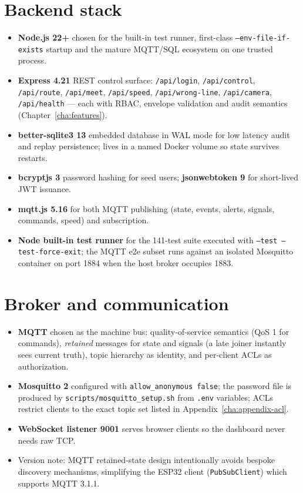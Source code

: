 \section{Backend stack}

\begin{itemize}
  \item \textbf{Node.js 22+} chosen for the built-in test runner, first-class
        \texttt{--env-file-if-exists} startup and the mature MQTT/SQL
        ecosystem on one trusted process.
  \item \textbf{Express 4.21} REST control surface: \texttt{/api/login},
        \texttt{/api/control}, \texttt{/api/route}, \texttt{/api/meet},
        \texttt{/api/speed}, \texttt{/api/wrong-line}, \texttt{/api/camera},
        \texttt{/api/health} --- each with RBAC, envelope validation and
        audit semantics (Chapter~\ref{cha:features}).
  \item \textbf{better-sqlite3 13} embedded database in WAL mode for low
        latency audit and replay persistence; lives in a named Docker
        volume so state survives restarts.
  \item \textbf{bcryptjs 3} password hashing for seed users;
        \textbf{jsonwebtoken 9} for short-lived JWT issuance.
  \item \textbf{mqtt.js 5.16} for both MQTT publishing (state, events,
        alerts, signals, commands, speed) and subscription.
  \item \textbf{Node built-in test runner} for the 141-test suite executed
        with \texttt{--test --test-force-exit}; the MQTT e2e subset runs
        against an isolated Mosquitto container on port 1884 when the
        host broker occupies 1883.
\end{itemize}

\section{Broker and communication}

\begin{itemize}
  \item \textbf{MQTT} chosen as the machine bus: quality-of-service
        semantics (QoS 1 for commands), \emph{retained} messages for state
        and signals (a late joiner instantly sees current truth), topic
        hierarchy as identity, and per-client ACLs as authorization.
  \item \textbf{Mosquitto 2} configured with
        \texttt{allow\_anonymous false}; the password file is produced by
        \texttt{scripts/mosquitto\_setup.sh} from \texttt{.env}
        variables; ACLs restrict clients to the exact topic set listed in
        Appendix~\ref{cha:appendix-acl}.
  \item \textbf{WebSocket listener 9001} serves browser clients so the
        dashboard never needs raw TCP.
  \item Version note: MQTT retained-state design intentionally avoids
        bespoke discovery mechanisms, simplifying the ESP32 client
        (\texttt{PubSubClient}) which supports MQTT 3.1.1.
\end{itemize}

